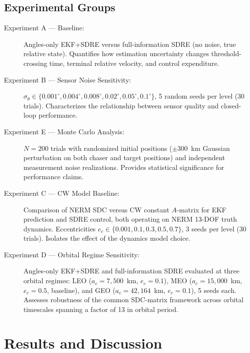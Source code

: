 \documentclass[preprint,3p,times]{elsarticle}
\begin{document}
\subsection{Experimental Groups}

\begin{description}
    \item[Experiment A --- Baseline:] Angles-only EKF+SDRE versus full-information SDRE (no noise, true relative state). Quantifies how estimation uncertainty changes threshold-crossing time, terminal relative velocity, and control expenditure.

    \item[Experiment B --- Sensor Noise Sensitivity:] $\sigma_\theta \in \{0.001^\circ, 0.004^\circ, 0.008^\circ, 0.02^\circ, 0.05^\circ, 0.1^\circ\}$, 5 random seeds per level (30 trials). Characterizes the relationship between sensor quality and closed-loop performance.

    \item[Experiment E --- Monte Carlo Analysis:] $N = 200$ trials with randomized initial positions ($\pm 300$~km Gaussian perturbation on both chaser and target positions) and independent measurement noise realizations. Provides statistical significance for performance claims.

    \item[Experiment C --- CW Model Baseline:] Comparison of NERM SDC versus CW constant $A$-matrix for EKF prediction and SDRE control, both operating on NERM 13-DOF truth dynamics. Eccentricities $e_c \in \{0.001, 0.1, 0.3, 0.5, 0.7\}$, 3 seeds per level (30 trials). Isolates the effect of the dynamics model choice.

    \item[Experiment D --- Orbital Regime Sensitivity:] Angles-only EKF+SDRE and full-information SDRE evaluated at three orbital regimes: LEO ($a_c = 7{,}500$~km, $e_c = 0.1$), MEO ($a_c = 15{,}000$~km, $e_c = 0.5$, baseline), and GEO ($a_c = 42{,}164$~km, $e_c = 0.1$), 5 seeds each. Assesses robustness of the common SDC-matrix framework across orbital timescales spanning a factor of 13 in orbital period.
\end{description}

\section{Results and Discussion}
\end{document}
